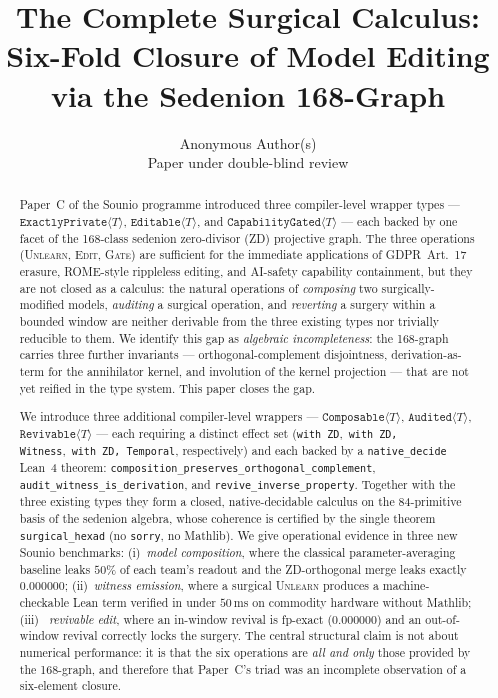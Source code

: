 \documentclass{article}
\title{The Complete Surgical Calculus:\\
       Six-Fold Closure of Model Editing via the Sedenion 168-Graph}
\author{%
  Anonymous Author(s)\\
  Paper under double-blind review%
}
\newcommand{\ExactlyPrivate}[1]{\texttt{ExactlyPrivate}\langle #1 \rangle}
\newcommand{\Editable}[1]{\texttt{Editable}\langle #1 \rangle}
\newcommand{\CapabilityGated}[1]{\texttt{CapabilityGated}\langle #1 \rangle}
\newcommand{\Composable}[1]{\texttt{Composable}\langle #1 \rangle}
\newcommand{\Audited}[1]{\texttt{Audited}\langle #1 \rangle}
\newcommand{\Revivable}[1]{\texttt{Revivable}\langle #1 \rangle}
\newcommand{\withZD}{\texttt{with ZD}}
\newcommand{\withWit}{\texttt{with ZD, Witness}}
\newcommand{\withTemp}{\texttt{with ZD, Temporal}}
\begin{document}
\maketitle

\begin{abstract}
Paper~C of the Sounio programme introduced three compiler-level wrapper
types ---
$\ExactlyPrivate{T}$, $\Editable{T}$, and $\CapabilityGated{T}$ ---
each backed by one facet of the 168-class sedenion zero-divisor (ZD)
projective graph.  The three operations (\textsc{Unlearn}, \textsc{Edit},
\textsc{Gate}) are sufficient for the immediate applications of
GDPR~Art.~17 erasure, ROME-style rippleless editing, and AI-safety
capability containment, but they are not closed as a calculus: the
natural operations of \emph{composing} two surgically-modified models,
\emph{auditing} a surgical operation, and \emph{reverting} a surgery
within a bounded window are neither derivable from the three existing
types nor trivially reducible to them.  We identify this gap as
\emph{algebraic incompleteness}: the 168-graph carries three further
invariants --- orthogonal-complement disjointness, derivation-as-term
for the annihilator kernel, and involution of the kernel projection
--- that are not yet reified in the type system.  This paper closes
the gap.

We introduce three additional compiler-level wrappers ---
$\Composable{T}$, $\Audited{T}$, $\Revivable{T}$ --- each
requiring a distinct effect set (\withZD{},~\withWit{},~\withTemp{},
respectively) and each backed by a \texttt{native\_decide} Lean~4
theorem: \texttt{composition\_preserves\_orthogonal\_complement},
\texttt{audit\_witness\_is\_derivation}, and
\texttt{revive\_inverse\_property}.  Together with the three existing
types they form a closed, native-decidable calculus on the 84-primitive
basis of the sedenion algebra, whose coherence is certified by the
single theorem \texttt{surgical\_hexad} (no \texttt{sorry}, no Mathlib).
We give operational evidence in three new Sounio benchmarks:
(i)~\emph{model composition}, where the classical parameter-averaging
baseline leaks $50\%$ of each team's readout and the ZD-orthogonal merge
leaks exactly $0.000000$; (ii)~\emph{witness emission}, where a
surgical \textsc{Unlearn} produces a machine-checkable Lean term verified
in under $50\,$ms on commodity hardware without Mathlib; (iii)~\emph{
revivable edit}, where an in-window revival is fp-exact ($0.000000$)
and an out-of-window revival correctly locks the surgery.  The central
structural claim is not about numerical performance: it is that the
six operations are \emph{all and only} those provided by the 168-graph,
and therefore that Paper~C's triad was an incomplete observation of a
six-element closure.
\end{abstract}
\end{document}
